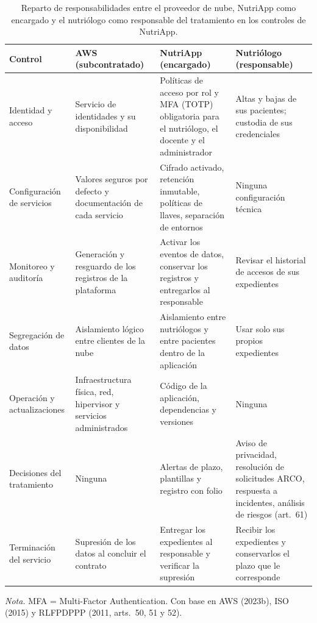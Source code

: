 \documentclass[12pt, a4paper]{article}
\begin{document}
\begin{table}[!htbp]
  \centering
    \caption{Reparto de responsabilidades entre el proveedor de nube,
  NutriApp como encargado y el nutriólogo como responsable del
  tratamiento en los controles de NutriApp.}
  \label{tab:responsabilidad}
  \small
  \begin{tabular}{>{\raggedright\arraybackslash}p{2.4cm}
    >{\raggedright\arraybackslash}p{3.9cm}
    >{\raggedright\arraybackslash}p{4.1cm}
    >{\raggedright\arraybackslash}p{3.9cm}}
  \toprule
  \textbf{Control} & \textbf{AWS (subcontratado)}
    & \textbf{NutriApp (encargado)}
    & \textbf{Nutriólogo (responsable)} \\
  \midrule
  Identidad y acceso
    & Servicio de identidades y su disponibilidad
    & Políticas de acceso por rol y MFA (TOTP) obligatoria para el
      nutriólogo, el docente y el administrador
    & Altas y bajas de sus pacientes; custodia de sus
      credenciales \\[4pt]
  Configuración de servicios
    & Valores seguros por defecto y documentación de cada servicio
    & Cifrado activado, retención inmutable, políticas de llaves,
      separación de entornos
    & Ninguna configuración técnica \\[4pt]
  Monitoreo y auditoría
    & Generación y resguardo de los registros de la plataforma
    & Activar los eventos de datos, conservar los registros y
      entregarlos al responsable
    & Revisar el historial de accesos de sus expedientes \\[4pt]
  Segregación de datos
    & Aislamiento lógico entre clientes de la nube
    & Aislamiento entre nutriólogos y entre pacientes dentro de la
      aplicación
    & Usar solo sus propios expedientes \\[4pt]
  Operación y actualizaciones
    & Infraestructura física, red, hipervisor y servicios
      administrados
    & Código de la aplicación, dependencias y versiones
    & Ninguna \\[4pt]
  Decisiones del tratamiento
    & Ninguna
    & Alertas de plazo, plantillas y registro con folio
    & Aviso de privacidad, resolución de solicitudes ARCO,
      respuesta a incidentes, análisis de riesgos (art.~61) \\[4pt]
  Terminación del servicio
    & Supresión de los datos al concluir el contrato
    & Entregar los expedientes al responsable y verificar la
      supresión
    & Recibir los expedientes y conservarlos el plazo que le
      corresponde \\
  \bottomrule
  \end{tabular}
 
  \vspace{4pt}
  \parbox{14cm}{\small\textit{Nota.} MFA = Multi-Factor
  Authentication. Con base en AWS (2023b),
  ISO (2015) y RLFPDPPP (2011, arts.~50, 51 y 52).}
\end{table}
\end{document}
